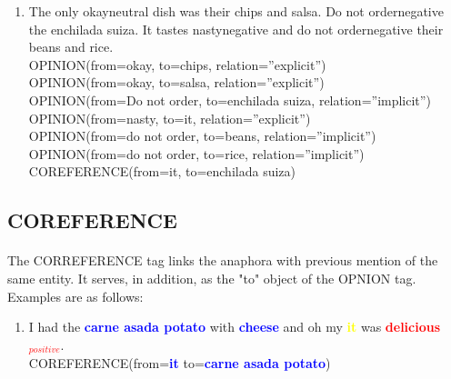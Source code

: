 \documentclass{article}
\begin{document}
\begin{enumerate}[resume]
\item The only okayneutral dish was their chips and salsa. Do not ordernegative the enchilada suiza. It tastes nastynegative and do not ordernegative their beans and rice. \\
OPINION(from=okay, to=chips, relation=”explicit”)\\
OPINION(from=okay, to=salsa, relation=”explicit”)\\
OPINION(from=Do not order, to=enchilada suiza, relation=”implicit”)\\
OPINION(from=nasty, to=it, relation=”explicit”)\\
OPINION(from=do not order, to=beans, relation=”implicit”)\\
OPINION(from=do not order, to=rice, relation=”implicit”)\\
COREFERENCE(from=it, to=enchilada suiza)
\end{enumerate}



\subsection{COREFERENCE}
\paragraph{}
The CORREFERENCE tag links the anaphora with previous mention of the same entity. It serves, in addition, as the "to" object of the OPNION tag. Examples are as follows:

	
	
	


\begin{enumerate}[resume]
	\item I had the \textbf{\textcolor{blue}{carne asada potato}} with \textbf{\textcolor{blue}{cheese}} and oh my \textbf{\textcolor{yellow}{it}} was \textbf{\textcolor{red}{delicious$_{positive}$}}.\\
	
	
	\textsc{COREFERENCE}(from=\textbf{\textcolor{blue}{it}} to=\textbf{\textcolor{blue}{carne asada potato}}) \\
\end{enumerate}
\end{document}
